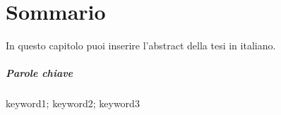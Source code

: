 \chapter{Sommario}
In questo capitolo puoi inserire l'abstract della tesi in italiano.

\paragraph{Parole chiave} keyword1; keyword2; keyword3